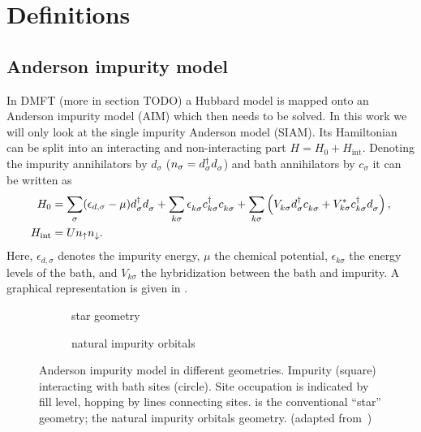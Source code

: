 
\chapter{Definitions}

\section{Anderson impurity model}

In DMFT (more in section TODO) a Hubbard model is mapped onto an Anderson impurity model (AIM)
which then needs to be solved.
In this work we will only look at the single impurity Anderson model (SIAM).
Its Hamiltonian can be split into an interacting and non-interacting part
$H = H_0 + H_\mathrm{int}$.
Denoting the impurity annihilators by $d_\sigma$ ($n_\sigma = d^\dag_\sigma d^{\pdag}_\sigma$)
and bath annihilators by $c_\sigma$
it can be written as
\begin{align}
    H_0
     & =
    \sum_{\pk\sigma} (\epsilon_{d,\sigma} - \mu) d^\dag_{\pk\sigma} d^{\pdag}_{\pk\sigma}
    +
    \sum_{k\sigma} \epsilon_{k\sigma}^{\pdag} c^\dag_{k\sigma} c^{\pdag}_{k\sigma}
    +
    \sum_{k\sigma} \left(V^{\ps}_{k\sigma} d^\dag_{\vphantom{k}\sigma} c^{\pdag}_{k\sigma}
    + V_{k\sigma}^* c^\dag_{k\sigma} d^{\pdag}_{\vphantom{k}\sigma} \right),
    \\
    H_\mathrm{int}
     & =
    U n_\uparrow n_\downarrow.
\end{align}
Here,
$\epsilon_{d,\sigma}$ denotes the impurity energy,
$\mu$ the chemical potential,
$\epsilon_{k\sigma}$ the energy levels of the bath,
and $V_{k\sigma}$ the hybridization between the bath and impurity.
A graphical representation is given in .

\begin{figure}[ht]
    \centering
    \savebox{\imagebox}{} %
    \begin{subfigure}{0.45\textwidth}
        \centering
        \usebox{\imagebox}
        \caption{star geometry}
        \label{subfig:geometry-star}
    \end{subfigure}
    \begin{subfigure}{0.45\textwidth}
        \centering
        \raisebox{\dimexpr0.5\ht\imagebox-0.5\height}
        {
            
        }
        \caption{natural impurity orbitals}
        \label{subfig:geometry-natural-impurity-orbitals}
    \end{subfigure}
    \caption{
        Anderson impurity model in different geometries.
        Impurity (square) interacting with bath sites (circle).
        Site occupation is indicated by fill level, hopping by lines connecting sites.
         is the conventional ``star'' geometry;
         the natural impurity orbitals geometry.
        (adapted from~\cite{Lu2019})
    }
\end{figure}

